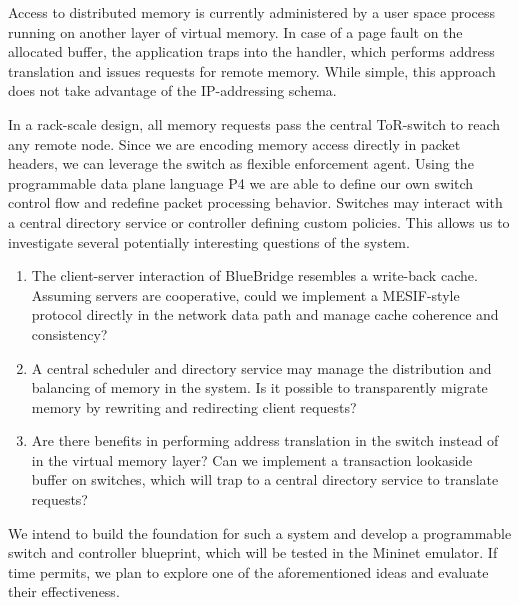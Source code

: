  Access to distributed memory is
currently administered by a user space process running on another layer of virtual memory. In case of a page fault on the allocated buffer, the application traps into the handler, which performs address translation and issues requests for remote memory. While simple, this approach does not take advantage of the IP-addressing schema.

In a rack-scale design, all memory requests pass the central ToR-switch to reach any remote node. Since we are encoding memory access directly in packet headers, we can leverage the switch as flexible enforcement agent. Using the programmable data plane language P4 we are able to define our own switch control flow and redefine packet processing behavior. Switches may interact with a central directory service or controller defining custom policies.
This allows us to investigate several potentially interesting questions of the system.
\begin{enumerate}
\item The client-server interaction of BlueBridge resembles a write-back cache. Assuming servers are cooperative, could we implement a MESIF-style protocol directly in the network data path and manage cache coherence and consistency?
\item A central scheduler and directory service may manage the distribution and balancing of memory in the system. Is it possible to transparently migrate memory by rewriting and redirecting client requests?
\item Are there benefits in performing address translation in the switch instead of in the virtual memory layer? Can we implement a transaction lookaside buffer on switches, which will trap to a central directory service to translate requests?

\end{enumerate}
We intend to build the foundation for such a system and develop a programmable switch and controller blueprint, which will be tested in the Mininet emulator. If time permits, we plan to explore one of the aforementioned ideas and evaluate their effectiveness.
